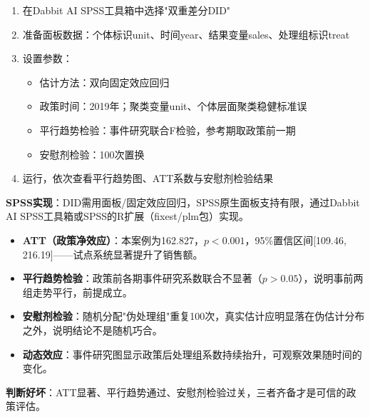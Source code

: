 \begin{algosposs}
\begin{enumerate}
    \item 在Dabbit AI SPSS工具箱中选择"双重差分DID"
    \item 准备面板数据：个体标识unit、时间year、结果变量sales、处理组标识treat
    \item 设置参数：
    \begin{itemize}
        \item 估计方法：双向固定效应回归
        \item 政策时间：2019年；聚类变量unit、个体层面聚类稳健标准误
        \item 平行趋势检验：事件研究联合F检验，参考期取政策前一期
        \item 安慰剂检验：100次置换
    \end{itemize}
    \item 运行，依次查看平行趋势图、ATT系数与安慰剂检验结果
\end{enumerate}

\textbf{SPSS实现}：DID需用面板/固定效应回归，SPSS原生面板支持有限，通过Dabbit AI SPSS工具箱或SPSS的R扩展（fixest/plm包）实现。
\end{algosposs}

\begin{algoresult}
\begin{itemize}
    \item \textbf{ATT（政策净效应）}：本案例为162.827，$p<0.001$，95\%置信区间[109.46, 216.19]——试点系统显著提升了销售额。
    \item \textbf{平行趋势检验}：政策前各期事件研究系数联合不显著（$p>0.05$），说明事前两组走势平行，前提成立。
    \item \textbf{安慰剂检验}：随机分配"伪处理组"重复100次，真实估计应明显落在伪估计分布之外，说明结论不是随机巧合。
    \item \textbf{动态效应}：事件研究图显示政策后处理组系数持续抬升，可观察效果随时间的变化。
\end{itemize}

\textbf{判断好坏}：ATT显著、平行趋势通过、安慰剂检验过关，三者齐备才是可信的政策评估。
\end{algoresult}

